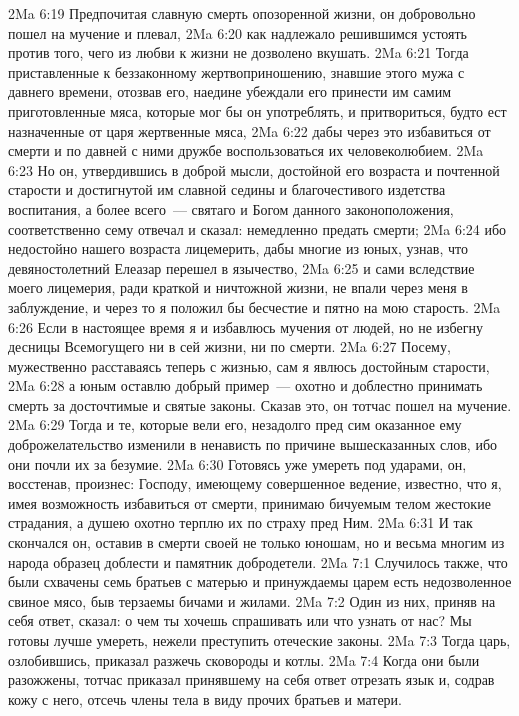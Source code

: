 \vs 2Ma 6:19 Предпочитая славную смерть опозоренной жизни, он добровольно пошел на мучение и плевал,
\vs 2Ma 6:20 как надлежало решившимся устоять против того, чего из любви к жизни не дозволено вкушать.
\vs 2Ma 6:21 Тогда приставленные к беззаконному жертвоприношению, знавшие этого мужа с давнего времени, отозвав его, наедине убеждали его принести им самим приготовленные мяса, которые мог бы он употреблять, и притвориться, будто ест назначенные от царя жертвенные мяса,
\vs 2Ma 6:22 дабы через это избавиться от смерти и по давней с ними дружбе воспользоваться их человеколюбием.
\vs 2Ma 6:23 Но он, утвердившись в доброй мысли, достойной его возраста и почтенной старости и достигнутой им славной седины и благочестивого издетства воспитания, а более всего~--- святаго и Богом данного законоположения, соответственно сему отвечал и сказал: немедленно предать смерти;
\vs 2Ma 6:24 ибо недостойно нашего возраста лицемерить, дабы многие из юных, узнав, что девяностолетний Елеазар перешел в язычество,
\vs 2Ma 6:25 и сами вследствие моего лицемерия, ради краткой и ничтожной жизни, не впали через меня в заблуждение, и через то я положил бы бесчестие и пятно на мою старость.
\vs 2Ma 6:26 Если в настоящее время я и избавлюсь мучения от людей, но не избегну десницы Всемогущего ни в сей жизни, ни по смерти.
\vs 2Ma 6:27 Посему, мужественно расставаясь теперь с жизнью, сам я явлюсь достойным старости,
\vs 2Ma 6:28 а юным оставлю добрый пример~--- охотно и доблестно принимать смерть за досточтимые и святые законы. Сказав это, он тотчас пошел на мучение.
\vs 2Ma 6:29 Тогда и те, которые вели его, незадолго пред сим оказанное ему доброжелательство изменили в ненависть по причине вышесказанных слов, ибо они почли их за безумие.
\vs 2Ma 6:30 Готовясь уже умереть под ударами, он, восстенав, произнес: Господу, имеющему совершенное ведение, известно, что я, имея возможность избавиться от смерти, принимаю бичуемым телом жестокие страдания, а душею охотно терплю их по страху пред Ним.
\vs 2Ma 6:31 И так скончался он, оставив в смерти своей не только юношам, но и весьма многим из народа образец доблести и памятник добродетели.
\vs 2Ma 7:1 Случилось также, что были схвачены семь братьев с матерью и принуждаемы царем есть недозволенное свиное мясо, быв терзаемы бичами и жилами.
\vs 2Ma 7:2 Один из них, приняв на себя ответ, сказал: о чем ты хочешь спрашивать или что узнать от нас? Мы готовы лучше умереть, нежели преступить отеческие законы.
\vs 2Ma 7:3 Тогда царь, озлобившись, приказал разжечь сковороды и котлы.
\vs 2Ma 7:4 Когда они были разожжены, тотчас приказал принявшему на себя ответ отрезать язык и, содрав кожу с него, отсечь члены тела в виду прочих братьев и матери.
